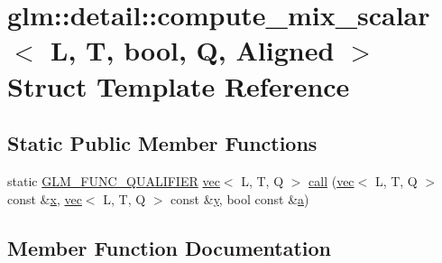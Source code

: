 \hypertarget{structglm_1_1detail_1_1compute__mix__scalar_3_01_l_00_01_t_00_01bool_00_01_q_00_01_aligned_01_4}{}\section{glm\+:\+:detail\+:\+:compute\+\_\+mix\+\_\+scalar$<$ L, T, bool, Q, Aligned $>$ Struct Template Reference}
\label{structglm_1_1detail_1_1compute__mix__scalar_3_01_l_00_01_t_00_01bool_00_01_q_00_01_aligned_01_4}
\subsection*{Static Public Member Functions}
\begin{DoxyCompactItemize}
\item 
static \mbox{\hyperlink{setup_8hpp_a33fdea6f91c5f834105f7415e2a64407}{G\+L\+M\+\_\+\+F\+U\+N\+C\+\_\+\+Q\+U\+A\+L\+I\+F\+I\+ER}} \mbox{\hyperlink{structglm_1_1vec}{vec}}$<$ L, T, Q $>$ \mbox{\hyperlink{structglm_1_1detail_1_1compute__mix__scalar_3_01_l_00_01_t_00_01bool_00_01_q_00_01_aligned_01_4_a34b102b44e5908978b3cd24b5ace0369}{call}} (\mbox{\hyperlink{structglm_1_1vec}{vec}}$<$ L, T, Q $>$ const \&\mbox{\hyperlink{_s_d_l__opengl_8h_ad0e63d0edcdbd3d79554076bf309fd47}{x}}, \mbox{\hyperlink{structglm_1_1vec}{vec}}$<$ L, T, Q $>$ const \&\mbox{\hyperlink{_s_d_l__opengl_8h_a1675d9d7bb68e1657ff028643b4037e3}{y}}, bool const \&\mbox{\hyperlink{_s_d_l__opengl__glext_8h_a3309789fc188587d666cda5ece79cf82}{a}})
\end{DoxyCompactItemize}


\subsection{Member Function Documentation}
\mbox{\label{structglm_1_1detail_1_1compute__mix__scalar_3_01_l_00_01_t_00_01bool_00_01_q_00_01_aligned_01_4_a34b102b44e5908978b3cd24b5ace0369}} 
